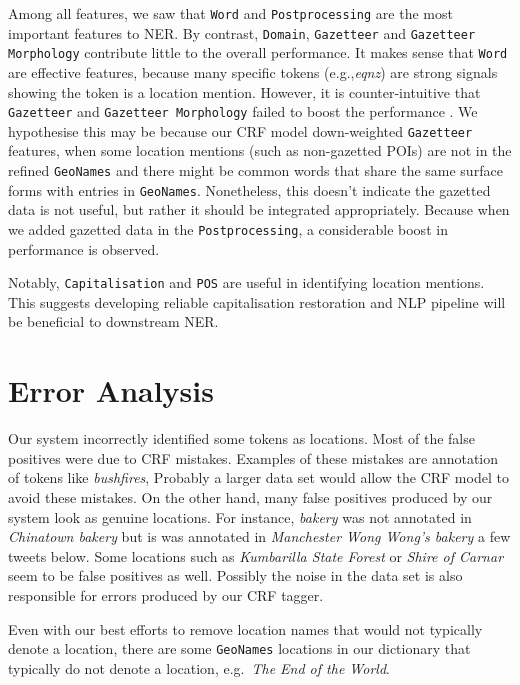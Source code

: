 \documentclass[11pt]{article}
\newcommand{\eg}{e.g.,\xspace}
\newcommand{\geoname}{\texttt{GeoNames}\xspace}
\newcommand{\myex}[1]{\textit{#1}}
\newcommand{\feature}[1]{\texttt{#1}\xspace}
\begin{document}
Among all features, we saw that \feature{Word} and \feature{Postprocessing} are the most important features to NER.
By contrast, \feature{Domain}, \feature{Gazetteer} and \feature{Gazetteer Morphology} contribute little to the overall performance.
It makes sense that \feature{Word} are effective features, because many specific tokens (\eg \myex{eqnz}) are strong signals showing the token is a location mention.
However, it is counter-intuitive that \feature{Gazetteer} and \feature{Gazetteer Morphology} failed to boost the performance \cite{conll09rati,acl11liux}.
We hypothesise this may be because our CRF model down-weighted \feature{Gazetteer} features, when some location mentions (such as non-gazetted POIs) are not in the refined \geoname and there might be common words that share the same surface forms with entries in \geoname.
Nonetheless, this doesn't indicate the gazetted data is not useful, but rather it should be integrated appropriately.
Because when we added gazetted data in the \feature{Postprocessing}, a considerable boost in performance is observed.

Notably, \feature{Capitalisation} and \feature{POS} are useful in identifying location mentions.
This suggests developing reliable capitalisation restoration and NLP pipeline will be beneficial to downstream NER.

\section{Error Analysis}
\label{sec:error_analysis}

Our system incorrectly identified some tokens as locations.
Most of the false positives were due to CRF mistakes.
Examples of these mistakes are annotation of tokens like \myex{bushfires}, 
Probably a larger data set would allow the CRF model to avoid these mistakes.
On the other hand, many false positives produced by our system look as genuine locations.
For instance, \myex{bakery} was not annotated in \myex{Chinatown bakery} but is was annotated in \myex{Manchester Wong Wong's bakery} a few tweets below.
Some locations such as \myex{Kumbarilla State Forest} or \myex{Shire of Carnar} seem to be false positives as well.
Possibly the noise in the data set is also responsible for errors produced by our CRF tagger.


Even with our best efforts to remove location names that would not typically denote a location, there are some \geoname locations in our dictionary that typically do not denote a location, e.g.~\myex{The End of the World}.
\end{document}
